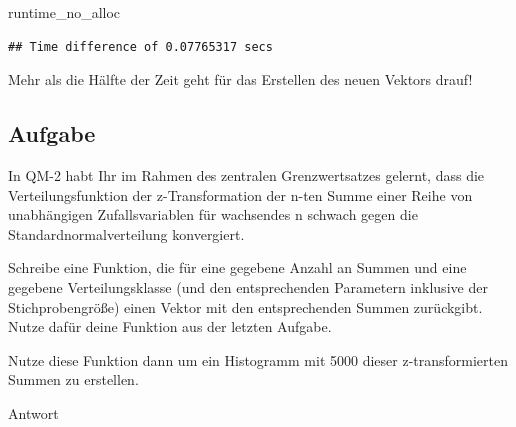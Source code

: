 \documentclass[
]{book}
\newenvironment{Shaded}{\begin{snugshade}}{\end{snugshade}}
\newcommand{\NormalTok}[1]{#1}
\begin{document}
\begin{Shaded}
\begin{Highlighting}[]
\NormalTok{runtime\_no\_alloc}
\end{Highlighting}
\end{Shaded}

\begin{verbatim}
## Time difference of 0.07765317 secs
\end{verbatim}

Mehr als die Hälfte der Zeit geht für das Erstellen des neuen Vektors drauf!

\hypertarget{aufgabe-4}{%
\subsection{Aufgabe}\label{aufgabe-4}}

In QM-2 habt Ihr im Rahmen des zentralen Grenzwertsatzes gelernt, dass die Verteilungsfunktion der z-Transformation der n-ten Summe einer Reihe von unabhängigen Zufallsvariablen für wachsendes n schwach gegen die Standardnormalverteilung konvergiert.

Schreibe eine Funktion, die für eine gegebene Anzahl an Summen und eine gegebene Verteilungsklasse (und den entsprechenden Parametern inklusive der Stichprobengröße) einen Vektor mit den entsprechenden Summen zurückgibt.
Nutze dafür deine Funktion aus der letzten Aufgabe.

Nutze diese Funktion dann um ein Histogramm mit 5000 dieser z-transformierten Summen zu erstellen.

Antwort
\end{document}

